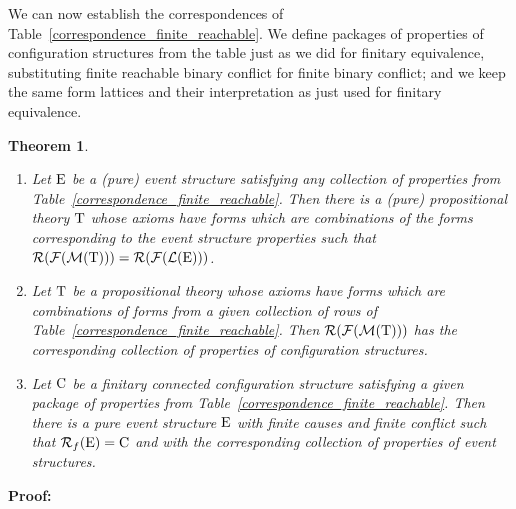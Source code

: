 \documentclass[twocolumn]{article}
\newtheorem{theo}{Theorem}
\newenvironment{theorem}[1]{\begin{theo} \rm \label{th-#1} }{\end{theo}}
\newcommand{\pf}{{\bf Proof:\ }}
\begin{document}
We can now establish the correspondences of Table~\ref{correspondence_finite_reachable}. 
We define packages of properties of configuration structures from the
table just as we did for finitary equivalence, substituting finite reachable
binary conflict for finite binary conflict; and we keep the same form
lattices and their interpretation as just used for finitary
equivalence.
\begin{theorem}{finite_reachable}~
\begin{enumerate}
\item Let ${\rm E}$ be a (pure) event structure
satisfying any collection of properties
from Table~\ref{correspondence_finite_reachable}. Then there is a (pure) propositional
theory ${\rm T}$ whose axioms
have forms which are combinations of the forms corresponding to the event structure 
properties such that ${\cal R}({\cal F}({\cal M}({\rm T}))) = {\cal R}({\cal F}({\cal L}({\rm E})))$.
\item Let ${\rm T}$ be a propositional theory whose axioms
have forms which are combinations of forms from a given collection of rows of 
Table~\ref{correspondence_finite_reachable}. Then ${\cal R}({\cal F}({\cal M}({\rm T})))$
has the corresponding collection of properties of configuration structures.
\item Let ${\rm C}$ be a finitary connected configuration structure
satisfying a given package of properties from
Table~\ref{correspondence_finite_reachable}. Then there is a pure
event structure ${\rm E}$ with finite causes and finite conflict such that
${\cal R}_f({\rm E}) = {\rm C}$ and with the corresponding collection of properties
of event structures.
\end{enumerate}
\end{theorem}
\pf
\end{document}
